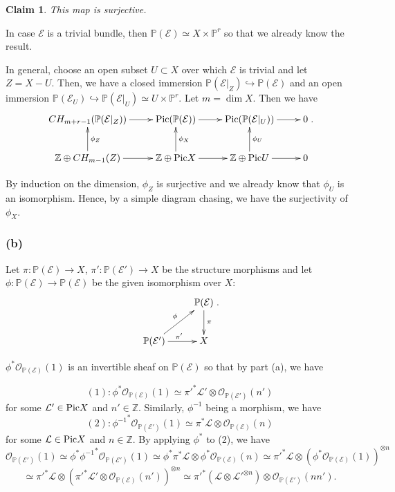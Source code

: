 \documentclass[11pt]{amsart}          %
\newcommand{\calO}{\mathcal{O}}
\newcommand{\calL}{\mathcal{L}}
\newcommand{\calE}{\mathcal{E}}
\newcommand{\bbZ}{\mathbb{Z}}
\newcommand{\bbP}{\mathbb{P}}
\newcommand{\pic}{{\rm Pic}}
\newtheorem*{claim}{Claim}
\begin{document}
\begin{enumerate}
\begin{claim} This map is surjective. \end{claim}

In case $\calE$ is a trivial bundle, then $\bbP(\calE) \simeq X \times \bbP^r$  so that we already know the result.

In general, choose an open subset $U \subset X$ over which $\calE$ is trivial and let $Z = X - U$. Then, we have a closed immersion $\bbP(\calE|_Z) \hookrightarrow \bbP(\calE)$ and an open immersion $\bbP(\calE_U) \hookrightarrow \bbP(\calE|_U) \simeq U \times \bbP^r$. Let $m = \dim X$. Then we have
$$\xymatrix{ CH_{m+r-1} (\bbP(\calE|_Z)) \ar[r] & \pic (\bbP(\calE)) \ar[r] & \pic (\bbP(\calE|_U)) \ar[r] &0 \\
\bbZ \oplus CH_{m-1} (Z) \ar[u] _{\phi_Z} \ar[r] & \bbZ \oplus \pic X \ar[r] \ar[u] _{\phi_X} & \bbZ \oplus \pic U \ar[r] \ar[u]_{\phi_U} & 0}.$$

By induction on the dimension, $\phi_Z$ is surjective and we already know that $\phi_U$ is an isomorphism. Hence, by a simple diagram chasing, we have the surjectivity of $\phi_X$.
\end{enumerate}

\subsubsection*{(b)} Let $\pi: \bbP(\calE) \to X$, $\pi' : \bbP(\calE') \to X$ be the structure morphisms and let $\phi: \bbP(\calE) \to \bbP(\calE)$ be the given isomorphism over $X$:
$$\xymatrix{ & \bbP(\calE) \ar[d] ^{\pi} \\ \bbP(\calE') \ar[ru]^{\phi} \ar[r]^{\pi'} & X}.$$

$\phi ^* \calO_{\bbP(\calE)} (1)$ is an invertible sheaf on $\bbP(\calE)$ so that by part (a), we have

$$(1) : \phi^* \calO_{\bbP(\calE)} (1) \simeq {\pi'}^* \calL' \otimes \calO_{\bbP(\calE')} (n')$$ for some $\calL' \in \pic X$ and $n' \in \bbZ$. Similarly, $\phi^{-1}$ being a morphism, we have
$$(2) : {\phi^{-1}}^* \calO_{\bbP(\calE')} (1) \simeq \pi^* \calL \otimes \calO_{\bbP(\calE)} (n)$$ for some $\calL \in \pic X$ and $n \in \bbZ$. By applying $\phi^*$ to (2), we have 
$$\calO_{\bbP(\calE')} (1) \simeq \phi^* {\phi^{-1}} ^* \calO_{\bbP(\calE')}(1) \simeq \phi^* \pi^* \calL \otimes \phi^* \calO_{\bbP(\calE)} (n) \simeq {\pi'}^* \calL \otimes \left( \phi^* \calO_{\bbP(\calE)} (1) \right) ^{\otimes n}$$
$$ \simeq {\pi'} ^* \calL \otimes \left( {\pi'} ^* \calL' \otimes \calO_{\bbP(\calE)} (n') \right) ^{\otimes n} \simeq {\pi'} ^* \left( \calL \otimes {\calL'} ^{\otimes n} \right) \otimes \calO_{\bbP(\calE')} (nn').$$
\end{document}
